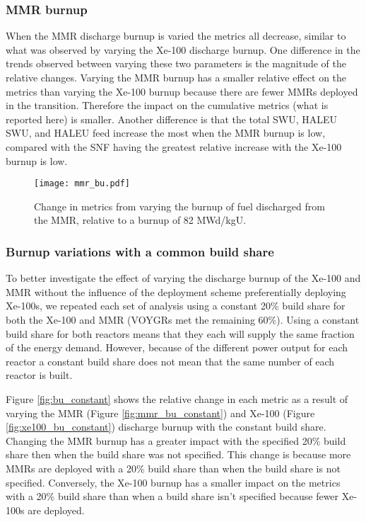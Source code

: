 \subsubsection{MMR burnup}
When the \gls{MMR} discharge burnup is varied the metrics all decrease, similar 
to what was observed by varying the Xe-100 discharge burnup. One difference in 
the trends observed between varying these two parameters is the magnitude of 
the relative changes. Varying the \gls{MMR} burnup has a smaller relative effect 
on the metrics than varying the Xe-100 burnup because there are fewer \glspl{MMR} 
deployed in the transition. Therefore the impact on the cumulative metrics 
(what is reported here) is smaller. Another difference is that the total 
\gls{SWU}, \gls{HALEU} \gls{SWU}, and \gls{HALEU} feed increase the most 
when the \gls{MMR} burnup is low, compared with the \gls{SNF} having the 
greatest relative increase with the Xe-100 burnup is low. 

\begin{figure}
    \centering
    \texttt{[image: mmr\_bu.pdf]}
    \caption{Change in metrics from varying the burnup of fuel 
    discharged from the MMR, relative to a burnup of 82 MWd/kgU.}
    \label{fig:mmr_bu_s7}
\end{figure}

\subsubsection{Burnup variations with a common build share}
To better investigate the effect of varying the discharge burnup of the Xe-100 
and \gls{MMR} without the influence of the deployment scheme preferentially
deploying Xe-100s, we repeated each set of analysis using a constant 20\% 
build share for both the Xe-100 and \gls{MMR} (VOYGRs met the remaining 60\%). 
Using a constant build share for 
both reactors means that they each will supply the same fraction of the energy demand.
However, because of the different power output for each reactor a constant build 
share does not mean that the same number of each reactor is built. 

Figure \ref{fig:bu_constant} shows the relative change in each metric as a result 
of varying the \gls{MMR} (Figure \ref{fig:mmr_bu_constant}) and Xe-100 
(Figure \ref{fig:xe100_bu_constant}) discharge burnup with the constant build 
share. Changing the \gls{MMR} burnup has a greater impact with the specified 20\% 
build share then when the build share was not specified. This change is because 
more \glspl{MMR} are deployed with a 20\% build share than when the build share is 
not specified. Conversely, the Xe-100 burnup has a smaller impact on the metrics 
with a 20\% build share than when a build share isn't specified because fewer 
Xe-100s are deployed. 

